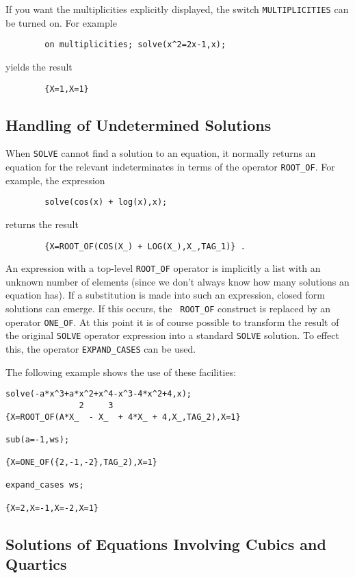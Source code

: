 If you want the multiplicities explicitly displayed, the switch
{\tt MULTIPLICITIES} can be turned on. For example
\begin{verbatim}
        on multiplicities; solve(x^2=2x-1,x);
\end{verbatim}
yields the result
\begin{verbatim}
        {X=1,X=1}
\end{verbatim}

\subsection{Handling of Undetermined Solutions}
When {\tt SOLVE} cannot find a solution to an equation, it normally
returns an equation for the relevant indeterminates in terms of the
operator {\tt ROOT\_OF}.  For example, the expression
\begin{verbatim}
        solve(cos(x) + log(x),x);
\end{verbatim}
returns the result
\begin{verbatim}
        {X=ROOT_OF(COS(X_) + LOG(X_),X_,TAG_1)} .
\end{verbatim}

An expression with a top-level {\tt ROOT\_OF} operator is implicitly a
list with an unknown number of elements (since we don't always know how
many solutions an equation has).  If a substitution is made into such an
expression, closed form solutions can emerge.  If this occurs, the {\tt
ROOT\_OF} construct is replaced by an operator {\tt ONE\_OF}.
At this point it is of course possible to transform the result of the
original {\tt SOLVE} operator expression into a standard {\tt SOLVE}
solution.  To effect this, the operator {\tt EXPAND\_CASES}
 can be used.

The following example shows the use of these facilities:
\begin{verbatim}
solve(-a*x^3+a*x^2+x^4-x^3-4*x^2+4,x);
               2     3
{X=ROOT_OF(A*X_  - X_  + 4*X_ + 4,X_,TAG_2),X=1}

sub(a=-1,ws);

{X=ONE_OF({2,-1,-2},TAG_2),X=1}

expand_cases ws;

{X=2,X=-1,X=-2,X=1}
\end{verbatim}

\subsection{Solutions of Equations Involving Cubics and Quartics}

